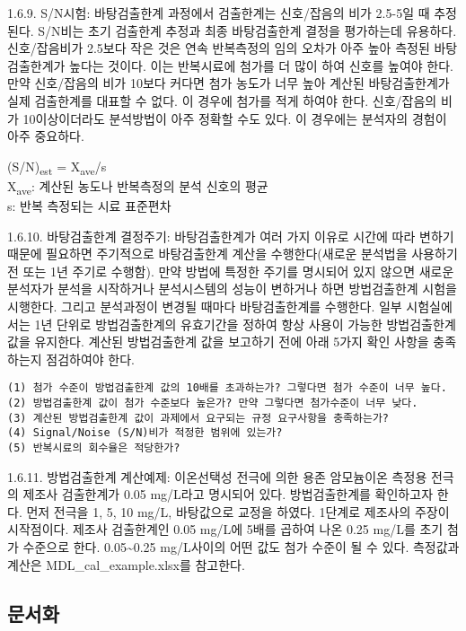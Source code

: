 \documentclass[
]{book}
\begin{document}
1.6.9. S/N시험: 바탕검출한계 과정에서 검출한계는 신호/잡음의 비가 2.5-5일 때 추정된다. S/N비는 초기 검출한계 추정과 최종 바탕검출한계 결정을 평가하는데 유용하다. 신호/잡음비가 2.5보다 작은 것은 연속 반복측정의 임의 오차가 아주 높아 측정된 바탕검출한계가 높다는 것이다. 이는 반복시료에 첨가를 더 많이 하여 신호를 높여야 한다. 만약 신호/잡음의 비가 10보다 커다면 첨가 농도가 너무 높아 계산된 바탕검출한계가 실제 검출한계를 대표할 수 없다. 이 경우에 첨가를 적게 하여야 한다. 신호/잡음의 비가 10이상이더라도 분석방법이 아주 정확할 수도 있다. 이 경우에는 분석자의 경험이 아주 중요하다.

(S/N)\textsubscript{est} = X\textsubscript{ave}/s\\
X\textsubscript{ave}: 계산된 농도나 반복측정의 분석 신호의 평균\\
s: 반복 측정되는 시료 표준편차

1.6.10. 바탕검출한계 결정주기: 바탕검출한계가 여러 가지 이유로 시간에 따라 변하기 때문에 필요하면 주기적으로 바탕검출한계 계산을 수행한다(새로운 분석법을 사용하기 전 또는 1년 주기로 수행함). 만약 방법에 특정한 주기를 명시되어 있지 않으면 새로운 분석자가 분석을 시작하거나 분석시스템의 성능이 변하거나 하면 방법검출한계 시험을 시행한다. 그리고 분석과정이 변경될 때마다 바탕검출한계를 수행한다. 일부 시험실에서는 1년 단위로 방법검출한계의 유효기간을 정하여 항상 사용이 가능한 방법검출한계 값을 유지한다.
계산된 방법검출한계 값을 보고하기 전에 아래 5가지 확인 사항을 충족하는지 점검하여야 한다.

\begin{verbatim}
(1) 첨가 수준이 방법검출한계 값의 10배를 초과하는가? 그렇다면 첨가 수준이 너무 높다. 
(2) 방법검출한계 값이 첨가 수준보다 높은가? 만약 그렇다면 첨가수준이 너무 낮다. 
(3) 계산된 방법검출한계 값이 과제에서 요구되는 규정 요구사항을 충족하는가? 
(4) Signal/Noise (S/N)비가 적정한 범위에 있는가?
(5) 반복시료의 회수율은 적당한가? 
\end{verbatim}

1.6.11. 방법검출한계 계산예제: 이온선택성 전극에 의한 용존 암모늄이온 측정용 전극의 제조사 검출한계가 0.05 mg/L라고 명시되어 있다. 방법검출한계를 확인하고자 한다. 먼저 전극을 1, 5, 10 mg/L, 바탕값으로 교정을 하였다. 1단계로 제조사의 주장이 시작점이다. 제조사 검출한계인 0.05 mg/L에 5배를 곱하여 나온 0.25 mg/L를 초기 첨가 수준으로 한다. 0.05\textasciitilde0.25 mg/L사이의 어떤 값도 첨가 수준이 될 수 있다. 측정값과 계산은 MDL\_cal\_example.xlsx를 참고한다.

\hypertarget{uxbb38uxc11cuxd654-1}{%
\subsection{문서화}\label{uxbb38uxc11cuxd654-1}}
\end{document}
